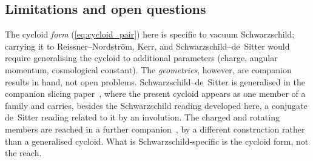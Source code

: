\documentclass[11pt,a4paper]{article}
\theoremstyle{definition}
\begin{document}
\subsection{Limitations and open questions}

The cycloid \emph{form} (\ref{eq:cycloid_pair}) here is specific to vacuum Schwarzschild; carrying it to Reissner--Nordström, Kerr, and Schwarzschild--de~Sitter would require generalising the cycloid to additional parameters (charge, angular momentum, cosmological constant). The \emph{geometries}, however, are companion results in hand, not open problems. Schwarzschild--de~Sitter is generalised in the companion slicing paper~\cite{JanzenSlicing}, where the present cycloid appears as one member of a family and carries, besides the Schwarzschild reading developed here, a conjugate de~Sitter reading related to it by an involution. The charged and rotating members are reached in a further companion~\cite{JanzenRange}, by a different construction rather than a generalised cycloid. What is Schwarzschild-specific is the cycloid form, not the reach.
\end{document}
